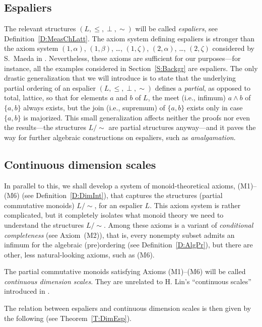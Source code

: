\documentclass[psamsfonts,reqno]{memo-l}
\theoremstyle{plain}
\theoremstyle{definition}
\theoremstyle{remark}
\numberwithin{equation}{section}
\newcommand{\pcm}{partial commutative mon\-oid}
\newcommand{\set}[1]{\{#1\}}
\begin{document}
\subsection*{Espaliers} The relevant structures
$(L,\leq,\perp,\sim)$ will be called \emph{espaliers}, see
Definition~\ref{D:MeasChLatt}. The axiom system defining espaliers is
stronger than the axiom system $(1,\alpha)$,
$(1,\beta)$, \dots, $(1,\zeta)$,
$(2,\alpha)$, \dots, $(2,\zeta)$ considered by S.~Maeda in
\cite{SMae55}. Nevertheless, these axioms are sufficient for our
purposes---for instance, all the examples considered in
Section~\ref{S:Backgr} are espaliers. The only drastic
generalization that we will introduce is to state that the underlying
partial ordering of an espalier
$(L,\leq,\perp,\sim)$ defines a
\emph{partial}, as opposed to total,
 lattice, so that for elements $a$ and
$b$ of $L$, the meet (i.e., infimum)
$a\wedge b$ of $\set{a,b}$ always exists, but the join (i.e., supremum) of
$\set{a,b}$ exists only in case $\set{a,b}$ is majorized. This small
generalization affects neither the proofs nor even the results---the
structures $L/{\sim}$ are partial structures anyway---and it paves the way
for further algebraic constructions on espaliers, such as \emph{amalgamation}.

\subsection*{Continuous dimension scales}
In parallel to this, we shall develop a system
of monoid-the\-o\-ret\-i\-cal axioms, (M1)--(M6) (see
Definition~\ref{D:DimInt}), that captures the structures (\pcm s)
$L/{\sim}$, for an espalier $L$. This axiom system is
rather complicated, but it completely
isolates what monoid theory we need to understand the structures
$L/{\sim}$. Among these axioms is a variant of \emph{conditional completeness}
(see Axiom~(M2)), that is, every nonempty subset admits an infimum for the
algebraic (pre)ordering (see Definition~\ref{D:AlgPr}), but there are other,
less natural-looking axioms, such as (M6).

The \pcm s satisfying Axioms (M1)--(M6) will be called \emph{continuous
dimension scales}. They are unrelated to H. Lin's ``continuous scales''
 introduced in \cite{Lin88,Lin91}.

The relation between espaliers and
continuous dimension scales is then
given by the following (see Theorem~\ref{T:DimEsp}).
\end{document}
